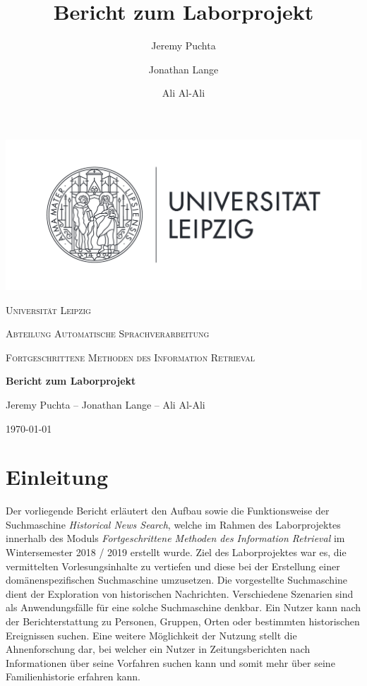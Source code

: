 \documentclass[11pt,a4paper, halfparskip]{scrartcl}
\title{Bericht zum Laborprojekt}
\author{Jeremy Puchta \and Jonathan Lange \and Ali Al-Ali}
\begin{document}
\begin{titlepage}
	\centering
	\includegraphics[width=1\textwidth]{Unilogo}\par\vspace{1cm}
	{\scshape\LARGE Universität Leipzig \par}
	\vspace{0.5cm}
	{\scshape\Large Abteilung Automatische Sprachverarbeitung\par}
	\vspace{0.2cm}
	{\scshape\large Fortgeschrittene Methoden des Information Retrieval\par}
	\vspace{1cm}
	{\huge\bfseries Bericht zum Laborprojekt\par}
	\vspace{1cm}
	{\Large Jeremy Puchta -- Jonathan Lange -- Ali Al-Ali \par}

	\vfill
	
	{\large \today\par}
\end{titlepage}

\newpage

\thispagestyle{empty}
\tableofcontents

\newpage
{}
\section{Einleitung}

Der vorliegende Bericht erläutert den Aufbau sowie die Funktionsweise der Suchmaschine \textit{Historical News Search}, welche im Rahmen des Laborprojektes innerhalb des Moduls \textit{Fortgeschrittene Methoden des Information Retrieval} im Wintersemester 2018 / 2019 erstellt wurde. 
Ziel des Laborprojektes war es, die vermittelten Vorlesungsinhalte zu vertiefen und diese bei der Erstellung einer domänenspezifischen Suchmaschine umzusetzen. 
Die vorgestellte Suchmaschine dient der Exploration von historischen Nachrichten.
Verschiedene Szenarien sind als Anwendungsfälle für eine solche Suchmaschine denkbar. 
Ein Nutzer kann nach der Berichterstattung zu Personen, Gruppen, Orten oder bestimmten historischen Ereignissen suchen.
Eine weitere Möglichkeit der Nutzung stellt die Ahnenforschung dar, bei welcher ein Nutzer in Zeitungsberichten nach Informationen über seine Vorfahren suchen kann und somit mehr über seine Familienhistorie erfahren kann.
\end{document}
